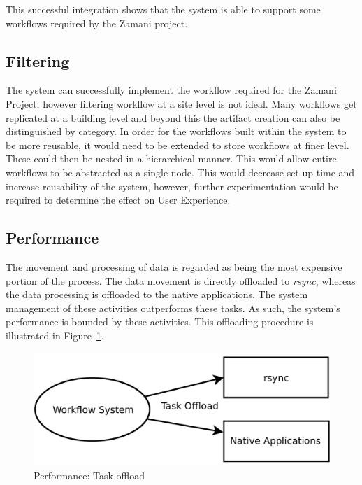 \noindent This successful integration shows that the system is able to support some
workflows required by the Zamani project.


\subsection{Filtering}
The system can successfully implement the workflow required for the Zamani
Project, however filtering workflow at a site level is not ideal. Many workflows
get replicated at a building level and beyond this the artifact creation can
also be distinguished by category. In order for the workflows built within the
system to be more reusable, it would need to be extended to store workflows at
finer level. These could then be nested in a hierarchical manner. This would
allow entire workflows to be abstracted as a single node. This would decrease
set up time and increase reusability of the system, however, further
experimentation would be required to determine the effect on User Experience.

\subsection{Performance}
The movement and processing of data is regarded as being the most expensive
portion of the process. The data movement is directly offloaded to \emph{rsync},
whereas the data processing is offloaded to the native applications. The system
management of these activities outperforms these tasks. As such, the system's
performance is bounded by these activities. This offloading procedure is
illustrated in Figure~\ref{eval:offload}.

\begin{figure}[!h]
    \begin{center}
        \includegraphics[scale=0.45]{figures/offload.pdf}
    \end{center}
    \caption{Performance: Task offload}
    \label{eval:offload}
\end{figure}

